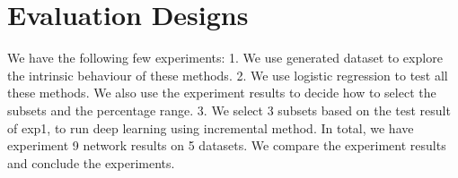 \section{Evaluation Designs}
We have the following few experiments:
1. We use generated dataset to explore the intrinsic behaviour of these methods.
2. We use logistic regression to test all these methods. We also use the experiment results to decide how to select the subsets and the percentage range.
3. We select 3 subsets based on the test result of exp1, to run deep learning using incremental method. In total, we have experiment 9 network results on 5 datasets. We compare the experiment results and conclude the experiments.
